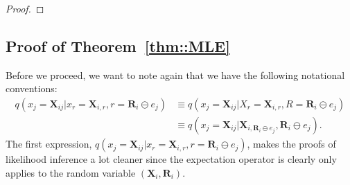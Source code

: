 \documentclass[aos, preprint]{imsart}
\theoremstyle{plain}
\theoremstyle{definition}
\let\hat\widehat
\newcommand{\bX}{\mathbf{X}}
\newcommand{\bR}{\mathbf{R}}
\begin{document}
\begin{appendix}
\begin{proof}
%
%
%
%
%
%


\end{proof}


\subsection{Proof of Theorem~\ref{thm::MLE}}


Before we proceed, we want to note again that 
we have the following notational conventions:
\begin{equation}
\begin{aligned}
 q(x_j = \bX_{ij}|x_{r} = \bX_{i, r}, r = \bR_i\ominus e_j)
& \equiv  q(x_j = \bX_{ij}|X_{r} = \bX_{i, r}, R = \bR_i\ominus e_j)\\
& \equiv  q(x_j = \bX_{ij}|\bX_{i, \bR_i\ominus e_j}, \bR_i\ominus e_j).
\end{aligned}
\label{eq::convention}
\end{equation}
The first expression, $ q(x_j = \bX_{ij}|x_{r} = \bX_{i, r}, r = \bR_i\ominus e_j)$,
makes the proofs of likelihood inference a lot cleaner since the expectation operator is clearly only applies to the random variable $(\bX_i, \bR_i)$. 



\end{appendix}
\end{document}
